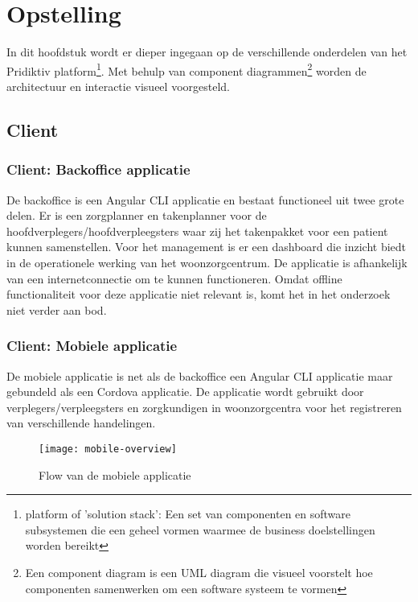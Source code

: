 
\chapter{Opstelling}
\label{ch:setup}

In dit hoofdstuk wordt er dieper ingegaan op de verschillende onderdelen van het Pridiktiv platform\footnote{platform of 'solution stack': Een set van componenten en software subsystemen die een geheel vormen waarmee de business doelstellingen worden bereikt}. Met behulp van component diagrammen\footnote{Een component diagram is een UML diagram die visueel voorstelt hoe componenten samenwerken om een software systeem te vormen} worden de architectuur en interactie visueel voorgesteld.
\section{Client}
\subsection{Client: Backoffice applicatie}
De backoffice is een Angular CLI applicatie en bestaat functioneel uit twee grote delen. Er is een zorgplanner en takenplanner voor de hoofdverplegers/hoofdverpleegsters waar zij het takenpakket voor een patient kunnen samenstellen. Voor het management is er een dashboard die inzicht biedt in de operationele werking van het woonzorgcentrum. De applicatie is afhankelijk van een internetconnectie om te kunnen functioneren. Omdat offline functionaliteit voor deze applicatie niet relevant is, komt het in het onderzoek niet verder aan bod.
\subsection{Client: Mobiele applicatie}
De mobiele applicatie is net als de backoffice een Angular CLI applicatie maar gebundeld als een Cordova applicatie. De applicatie wordt gebruikt door verplegers/verpleegsters en zorgkundigen in woonzorgcentra voor het registreren van verschillende handelingen.

\begin{figure}[h]
\caption{Flow van de mobiele applicatie}
\centering
\texttt{[image: mobile-overview]}
\end{figure}

